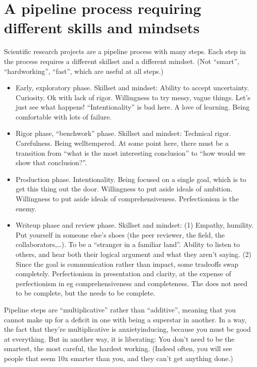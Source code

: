 \documentclass[letterpaper,10pt,english]{sphinxmanual}
\begin{document}
\section{A pipeline process requiring different skills and mindsets}
\label{\detokenize{02Elements:a-pipeline-process-requiring-different-skills-and-mindsets}}
\sphinxAtStartPar
Scientific research projects are a pipeline process with many steps.
Each step in the process requires a different skillset and a different mindset.
(Not “smart”, “hardworking”, “fast”, which are useful at all steps.)
\begin{itemize}
\item {} 
\sphinxAtStartPar
Early, exploratory phase. Skillset and mindset: Ability to accept uncertainty. Curiosity. Ok with lack of rigor. Willingness to try messy, vague things. Let’s just see what happens! “Intentionality” is bad here. A love of learning. Being comfortable with lots of failure.

\item {} 
\sphinxAtStartPar
Rigor phase, “benchwork” phase. Skillset and mindset: Technical rigor. Carefulness. Being well\sphinxhyphen{}tempered. At some point here, there must be a transition from “what is the most interesting conclusion” to “how would we show that conclusion?”.

\item {} 
\sphinxAtStartPar
Production phase. Intentionality. Being focused on a single goal, which is to get this thing out the door. Willingness to put aside ideals of ambition. Willingness to put aside ideals of comprehensiveness. Perfectionism is the enemy.

\item {} 
\sphinxAtStartPar
Write\sphinxhyphen{}up phase and  review phase. Skillset and mindset: (1) Empathy, humility. Put yourself in someone else’s shoes (the peer reviewer, the field, the collaborators,…). To be a “stranger in a familiar land”. Ability to listen to others, and hear both their logical argument and what they aren’t saying. (2) Since the goal is communication rather than impact, some tradeoffs swap completely. Perfectionism in presentation and clarity, at the expense of perfectionism in eg comprehensiveness and completeness. The  does not need to be complete, but the  needs to be complete.

\end{itemize}

\sphinxAtStartPar
Pipeline steps are “multiplicative” rather than “additive”, meaning that you cannot make up for a deficit in one with being a superstar in another.
In a way, the fact that they’re multiplicative is anxiety\sphinxhyphen{}inducing, because you must be good at everything.
But in another way, it is liberating: You don’t need to be the smartest, the most careful, the hardest working. (Indeed often, you will see people that seem 10x smarter than you, and they can’t get anything done.)
\end{document}
